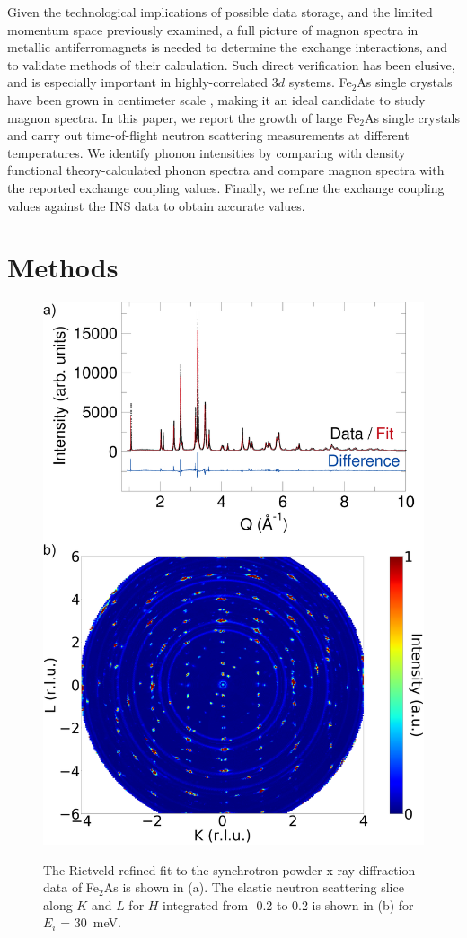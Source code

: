\documentclass[letterpaper,10pt,doublespacing,edeposit]{uiucthesis2020}
\begin{document}
\begin{mainmatter}
Given the technological implications of possible data storage, and the limited momentum space previously examined, a full picture of magnon spectra in metallic antiferromagnets is needed to determine the exchange interactions, and to validate methods of their calculation. Such direct verification has been elusive, and is especially important in highly-correlated 3$d$ systems.
Fe$_2$As single crystals have been grown in centimeter scale \cite{Katsuraki1966},  making it an ideal candidate to study magnon spectra. In this paper, we report the growth of large Fe$_2$As single crystals and carry out time-of-flight neutron scattering measurements at different temperatures. We identify phonon intensities by comparing with density functional theory-calculated phonon spectra and compare magnon spectra with the reported exchange coupling values. Finally, we refine the exchange coupling values against the INS data to obtain accurate values.


\section{Methods}

\begin{figure}
\centering\includegraphics[width=0.65\columnwidth]{figures/ch8/11BM_refinement_elastic_slice.png} \\
\caption{\label{fig:photo_11_BM}
The Rietveld-refined fit to the synchrotron powder x-ray diffraction data of Fe$_2$As is shown in (a). 
The elastic neutron scattering slice along $K$ and $L$ for $H$ integrated from -0.2 to 0.2 is shown in (b) for $E_i$ = 30~meV. 
}


\end{figure}
\end{mainmatter}
\end{document}
